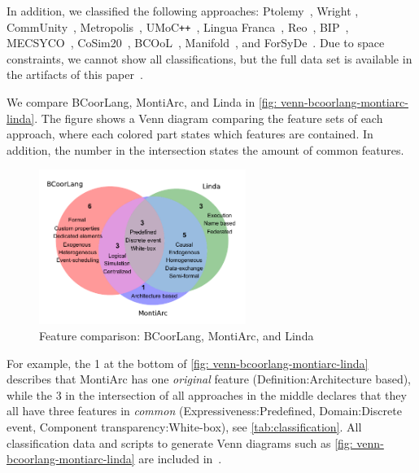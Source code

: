 \documentclass[runningheads]{llncs}
\begin{document}
In addition, we classified the following approaches: Ptolemy~\cite{ekerTamingHeterogeneityPtolemy2003,ptolemaeusSystemDesignModeling2014}, Wright \cite{allenFormalBasisArchitectural1997,allenFormalApproachSoftware1997}, CommUnity~\cite{fiadeiroSemanticsArchitecturalConnectors1997,oliveiraCommUnityWorkbench2007}, Metropolis~\cite{balarinMetropolisIntegratedElectronic2003}, UMoC\texttt{++}~\cite{mathaikuttyUMoCBasedMultiMoC2006}, Lingua Franca~\cite{lohstrohReactorsDeterministicModel2020,lohstrohLinguaFrancaDeterministic2021}, Reo~\cite{arbabReoChannelbasedCoordination2004}, BIP~\cite{bliudzeAlgebraConnectorsStructuring2008,basuRigorousComponentBasedSystem2011},
MECSYCO~\cite{camusCosimulationCyberphysicalSystems2018,camusHybridCosimulationFMUs2016},
CoSim20~\cite{liboniComplexSystemsCosimulation2021},
BCOoL~\cite{varalarsenBehavioralCoordinationOperator2015,varalarsenBCOolBehavioralCoordination2016},
Manifold~\cite{arbabOverviewManifoldIts1993,papadopoulosModellingActivitiesInformation1998}, and ForSyDe~\cite{sanderSystemModelingTransformational2004,sanderForSyDeSystemDesign2016}.
Due to space constraints, we cannot show all classifications, but the full data set is available in the artifacts of this paper~\cite{timkrauterArtifactsCoordination2024}.

We compare BCoorLang, MontiArc, and Linda in \autoref{fig: venn-bcoorlang-montiarc-linda}.
The figure shows a Venn diagram comparing the feature sets of each approach, where each colored part states which features are contained.
In addition, the number in the intersection states the amount of common features.

\begin{figure}[ht]
	\centering
	\includegraphics[width=0.6\textwidth]{images/venn_bcoorlang_montiarc_linda}
	\caption{Feature comparison: BCoorLang, MontiArc, and Linda}
	\label{fig: venn-bcoorlang-montiarc-linda}
\end{figure}

For example, the \textsf{1} at the bottom of \autoref{fig: venn-bcoorlang-montiarc-linda} describes that MontiArc has one \textit{original} feature (\textsf{Definition:Architecture based}), while the \textsf{3} in the intersection of all approaches in the middle declares that they all have three features in \textit{common} (\textsf{Expressiveness:Predefined, Domain:Discrete event, Component transparency:White-box}), see \autoref{tab:classification}.
All classification data and scripts to generate Venn diagrams such as \autoref{fig: venn-bcoorlang-montiarc-linda} are included in~\cite{timkrauterArtifactsCoordination2024}.
\end{document}
